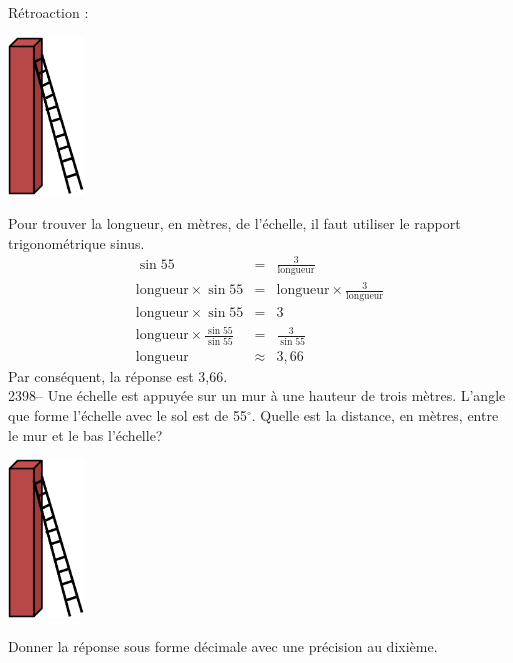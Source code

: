 \documentclass[letterpaper, 12pt]{article}
\begin{document}
R\'etroaction :\\
\begin{center}
 \includegraphics[width=2cm,bb=14 14 332 623]{Q2396.eps}
\end{center}
Pour trouver la longueur, en m\`etres, de l'\'echelle, il faut utiliser le rapport trigonom\'etrique sinus.
\begin{eqnarray*}
 \sin{55}&=&\frac{3}{\textrm{longueur}}\\[2mm]
\textrm{longueur} \times \sin{55}&=&\textrm{longueur} \times \frac{3}{\textrm{longueur}}\\[2mm]
\textrm{longueur} \times \sin{55}&=&3\\[2mm]
\textrm{longueur} \times \frac{\sin{55}}{\sin{55}}&=&\frac{3}{\sin{55}}\\[2mm]
\textrm{longueur} &\approx&3,66
\end{eqnarray*}
Par cons\'equent, la r\'eponse est 3,66.\\

2398-- Une \'echelle est appuy\'ee sur un mur \`a une hauteur de trois m\`etres. L'angle que forme l'\'echelle avec le sol est de 55$^{\circ}$. Quelle est la distance, en m\`etres, entre le mur et le bas l'\'echelle?\\
\begin{center}
 \includegraphics[width=2cm,bb=14 14 332 623]{Q2396.eps}
\end{center}
Donner la r\'eponse sous forme d\'ecimale avec une pr\'ecision au dixi\`eme.\\
\end{document}
